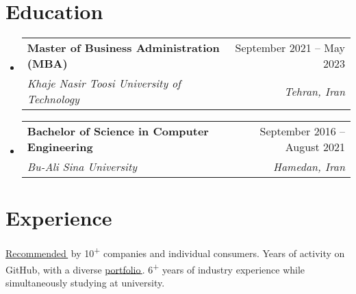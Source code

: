 \documentclass[11pt,a4paper]{article}
\makeatletter
\let\orighref\href
\renewcommand{\href}[2]{\orighref{#1}{#2\,{\textsuperscript{\tiny{\faExternalLink}}}}}
\newcommand{\deemph}[1]{{\color{black!40}#1}}
\newcommand{\resumeSubheading}[4]{
  \vspace{-2pt}\item
    \begin{tabular*}{0.97\textwidth}[t]{l@{\extracolsep{\fill}}r}
      \textbf{#1} & \small\deemph{#2} \\
      \textit{\small#3} & \textit{\small\deemph{#4}} \\
    \end{tabular*}\vspace{-7pt}
}
\newcommand{\resumeSubHeadingListStart}{\begin{itemize}[leftmargin=0.15in, label={}]}
\newcommand{\resumeSubHeadingListEnd}{\end{itemize}}
\makeatother
\begin{document}
\begin{justify}

\section{Education}
  \resumeSubHeadingListStart
    \resumeSubheading
      {Master of Business Administration (MBA)}{September 2021 -- May 2023}
      {Khaje Nasir Toosi University of Technology}{Tehran, Iran}
    \resumeSubheading
      {Bachelor of Science in Computer Engineering}{September 2016 -- August 2021}
      {Bu-Ali Sina University}{Hamedan, Iran}
  \resumeSubHeadingListEnd

\section{Experience}
    \small\href{https://kouy.ir/recommendation}{Recommended} by 10\textsuperscript{+} companies and individual consumers. Years of activity on GitHub, with a diverse \href{https://kouy.ir/portfolio}{portfolio}. 6\textsuperscript{+} years of industry experience while simultaneously studying at university.


\end{justify}
\end{document}
